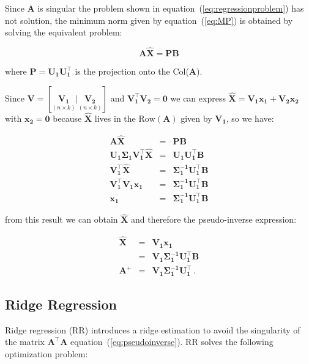 Since $\mathbf{A}$ is singular the problem shown in
equation~(\ref{eq:regressionproblem}) has not solution, the minimum norm given
by equation~(\ref{eq:MP}) is obtained by solving the equivalent problem:

\begin{equation*}
\label{eq:proyectorsol}
\mathbf{A \hat{X} = PB} 
\end{equation*}

\noindent where $\mathbf{P=U_1 U_1^\top}$ is the projection onto the
Col($\mathbf{A}$). 

Since $\mathbf{V} = [\underset{(n \times k)}{\mathbf{V_1}} |
\underset{(n \times k)}{\mathbf{V_2}}]$ and $\mathbf{V_1^\top V_2 =
0}$ we can express $\mathbf{\hat{X}} = \mathbf{V_1 x_1 + V_2 x_2}$
with $\mathbf{x_2=0}$ because $\mathbf{\hat{X}}$ lives in the
$\text{Row}(\mathbf{A})$ given by $\mathbf{V_1}$, so we have:

\begin{eqnarray*}
\mathbf{A \hat{X}} &=& \mathbf{PB} \\
\mathbf{U_1 \Sigma_1 V_1^\top \hat{X}} &=& \mathbf{U_1 U_1^\top B} \\
\mathbf{ V_1^\top \hat{X}} &=&  \mathbf{\Sigma_1^{-1} U_1^\top B} \\ 
\mathbf{ V_1^\top V_1 x_1} &=& \mathbf{\Sigma_1^{-1}
U_1^\top B} \\
\mathbf{x_1}&=& \mathbf{\Sigma_1^{-1} U_1^\top B}
\end{eqnarray*}

\noindent from this result we can obtain $\mathbf{\hat{X}}$ and
therefore the pseudo-inverse expression:

\begin{eqnarray*}
\mathbf{\hat{X}} &=& \mathbf{V_1 x_1} \\
                &=& \mathbf{V_1 \Sigma_1^{-1} U_1^\top B} \\
\mathbf{A^+} &=& \mathbf{V_1 \Sigma_1^{-1} U_1^\top} \, .
\end{eqnarray*}




\subsection{Ridge Regression}\label{sec:RR}

Ridge regression (RR) introduces a ridge estimation to avoid the
singularity of the matrix $\mathbf{A}^\top \mathbf{A}$
equation~(\ref{eq:pseudoinverse}). RR solves the following
optimization problem:

